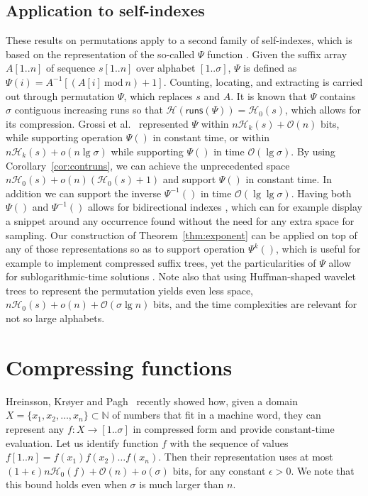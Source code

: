 \documentclass[11pt]{article}
\newcommand{\Oh}[1]
    {\ensuremath{\mathcal{O}\left( {#1} \right)}}
\newcommand{\runs}
    {\ensuremath{\mathsf{runs}}}
\newcommand{\HH}{\mathcal{H}}
\newcommand{\Ho}{\HH_0}
\newcommand{\Hk}{\HH_k}
\begin{document}
\subsection {Application to self-indexes}

These results on permutations apply to a second family of self-indexes, which
is based on the representation of the so-called $\Psi$ function 
\cite{GV05,GGV03,Sad03}. Given the suffix array $A[1..n]$ of sequence $s[1..n]$
over alphabet $[1..\sigma]$, $\Psi$ is defined as $\Psi(i) = 
A^{-1}[(A[i]~\textrm{mod}~n)+1]$. Counting, locating, and extracting is carried
out through permutation $\Psi$, which replaces $s$ and $A$. It is known 
\cite{GV05} that $\Psi$ contains $\sigma$ contiguous increasing runs so that 
$\HH(\runs(\Psi)) = \Ho(s)$, which allows for its compression. Grossi et 
al.~\cite{GGV03} represented $\Psi$ within $n\Hk(s)+\Oh{n}$ bits,
while supporting operation $\Psi()$ in constant time, or within $n\Hk(s)+
o(n\lg\sigma)$ while supporting $\Psi()$ in time $\Oh{\lg\sigma}$. 
By using Corollary~\ref{cor:contruns}, we can achieve the
unprecedented space $n\Ho(s) + o(n)(\Ho(s)+1)$ and support $\Psi()$ in
constant time. In addition we can support the inverse $\Psi^{-1}()$ in time 
$\Oh{\lg\lg\sigma}$. Having both $\Psi()$ and $\Psi^{-1}()$ allows for
bidirectional indexes \cite{RNOM09}, which can for example display a snippet 
around any occurrence found without the need for any extra space for sampling. 
Our construction of 
Theorem~\ref{thm:exponent} can be applied on top of any of those 
representations so as to support operation $\Psi^k()$, which is useful for
example to implement compressed suffix trees, yet the particularities of
$\Psi$ allow for sublogarithmic-time solutions \cite{GGV03}. Note also that
using Huffman-shaped wavelet trees to represent the permutation \cite{BN11} 
yields even less space, $n\Ho(s) + o(n) + \Oh{\sigma\lg n}$ bits, and the 
time complexities are relevant for not so large alphabets.

\section{Compressing functions} \label{sec:functions}

Hreinsson, Kr{\o}yer and Pagh~\cite{HKP09} recently showed how, given a
domain \(X = \{x_1, x_2, \ldots, x_n\} \subset \mathbb{N}\) of numbers that
fit in a machine word, they can represent any \(f: X \rightarrow
[1..\sigma]\) in compressed form and provide constant-time evaluation.
Let us identify function $f$ with the sequence of values
$f[1..n] = f(x_1) f(x_2) \ldots f(x_n)$. Then their representation uses
at most \((1 + \epsilon) n \Ho (f) + \Oh{n} 
+ o (\sigma)\) bits, for any constant \(\epsilon > 0\).
We note that this bound holds even when $\sigma$ is much larger than $n$. 
\end{document}
